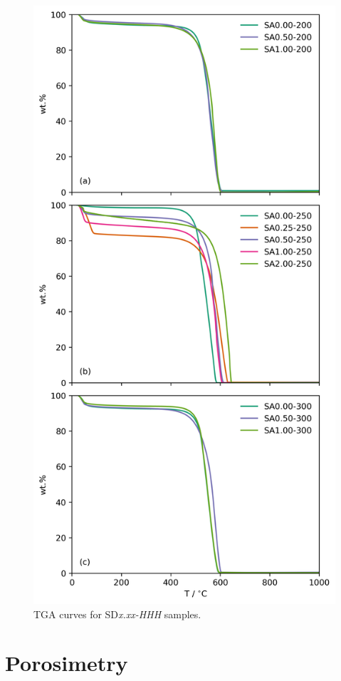 \begin{appendices}
\begin{figure}[h!]
    \centering
    \includegraphics[width=0.8\columnwidth, keepaspectratio]{4-impregnation/figs/SD_tga_adj.png}
    \caption{TGA curves for SD\textit{x.xx-HHH} samples.}
    \label{fig:SD_tga}
\end{figure}

\chapter{Porosimetry}


\end{appendices}
